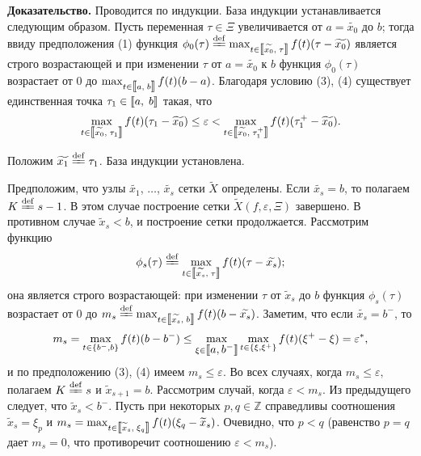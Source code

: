 \documentclass{spisok-article}
\newcommand{\defabove}{\stackrel{\rm def}{=\kern-3.6pt=}}
\begin{document}
   {\bf Доказательство.}
    Проводится по индукции.
База индукции устанавливается следующим образом. Пусть
    переменная $\tau\in\Xi$ увеличивается от $a=\widetilde{x_0}$ до $b$;
    тогда ввиду предположения (1) функция
    $\phi_0(\tau)\defabove \max_{t\in\hbox{\rm\textlbrackdbl}\widetilde{x_0},\;
      \tau\hbox{\rm\textrbrackdbl}} f(t)(\tau-\widetilde{x_0})$
    является строго возрастающей и при изменении $\tau$ от
     $a=\widetilde{x_0}$ к $b$ функция $\phi_0(\tau)$  возрастает от $0$ до
    $\max_{t\in\hbox{\rm\textlbrackdbl}a,\;b\hbox{\rm\textrbrackdbl}} f(t)(b-a)$.
    Благодаря условию (3), (4) существует единственная точка $\tau_1\in
    \hbox{\rm\textlbrackdbl}a,\;b\hbox{\rm\textrbrackdbl}$
    такая, что
   $$\max_{t\in\hbox{\rm\textlbrackdbl}\widetilde{x_0},\;
         \tau_1\hbox{\rm\textrbrackdbl}} f(t)
    (\tau_1-\widetilde{x_0})\leq\varepsilon
    <\max_{t\in\hbox{\rm\textlbrackdbl}\widetilde{x_0},\;
        \tau^+_1\hbox{\rm\textrbrackdbl}} f(t)
    (\tau^+_1-\widetilde{x_0}).
    $$


    Положим $\widetilde{x_1}\defabove \tau_1$. База индукции установлена.

    Предположим, что узлы $\widetilde{x_1}$, $\dots$, $\widetilde{x_s}$ сетки
    $\widetilde X$ определены. Если $\widetilde{x_s}=b$, то полагаем $K\defabove s-1$.
    В этом случае построение сетки $\widetilde{X}(f,\varepsilon,\Xi)$ завершено.
    В противном случае $\widetilde x_s<b$,
    и построение сетки продолжается. Рассмотрим функцию
    $$\phi_s(\tau)\defabove\max_{t\in\hbox{\rm\textlbrackdbl}\widetilde{x_s},\;
      \tau\hbox{\rm\textrbrackdbl}} f(t)(\tau-\widetilde{x_s});$$
    она  является строго возрастающей: при изменении $\tau$ от
     $\widetilde x_s$ до $b$ функция $\phi_s(\tau)$  возрастает от $0$ до
    $m_s\defabove\max_{t\in\hbox{\rm\textlbrackdbl}\widetilde{x_s},\;
      b\hbox{\rm\textrbrackdbl}} f(t)(b-\widetilde{x_s})$.
   Заметим, что если  $\widetilde{x_s}=b^-$, то
   $$m_s=\max_{t\in\{b^-,b\}}f(t)(b-b^-)\leq
   \max_{\xi\in\hbox{\textlbrackdbl$a,b^-$\textrbrackdbl}}
  \max_{t\in \{\xi,\xi^+\}}f(t)(\xi^+-\xi)=\varepsilon^*,
  $$
  и по предположению (3), (4) имеем $m_s\leq\varepsilon$.
   Во всех случаях, когда  $m_s\leq \varepsilon,$ полагаем
   $K\defabove s$ и  $\widetilde x_{s+1}=b$.
Рассмотрим случай, когда  $\varepsilon<m_s$. Из предыдущего следует,
    что $\widetilde x_s<b^-$. Пусть при
    некоторых  $p,q\in \mathbb Z$ справедливы соотношения
     $\widetilde x_s=\xi_p$ и
    $m_s= \max_{t\in\hbox{\rm\textlbrackdbl}\widetilde x_s,\;
      \xi_q\hbox{\rm\textrbrackdbl}} f(t)(\xi_q-\widetilde x_s)$.
      Очевидно, что $p<q$ (равенство
    $p=q$ дает $m_s=0$, что противоречит соотношению
    $\varepsilon<m_s$).
\end{document}
